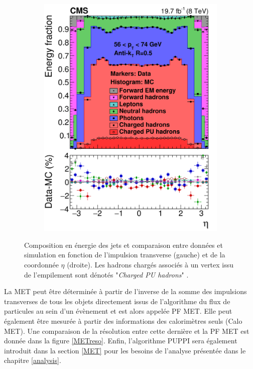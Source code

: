 \begin{figure}[]
\begin{subfigure}{0.5\linewidth}
    \includegraphics[width=0.95\linewidth]{Chapitre4/Images/PFJetETA.png} 
    \caption*{} 
    \end{subfigure}
    \caption{Composition en énergie des jets et comparaison entre données et simulation en fonction de l'impulsion transverse (gauche) et de la coordonnée $\eta$ (droite). Les hadrons chargés associés à un vertex issu de l'empilement sont dénotés "\textit{Charged PU hadrons}" \cite{ThePFAlgo}.}
    \label{JetEnergy}
\end{figure}

La MET peut être déterminée à partir de l'inverse de la somme des impulsions transverses de tous les objets directement issus de l'algorithme du flux de particules au sein d'un évènement et est alors appelée PF MET. Elle peut également être mesurée à partir des informations des calorimètres seuls (Calo MET). Une comparaison de la résolution entre cette dernière et la PF MET est donnée dans la figure \ref{METreso}. Enfin, l'algorithme PUPPI \cite{puppi} sera également introduit dans la section \ref{MET} pour les besoins de l'analyse présentée dans le chapitre \ref{analysis}.

